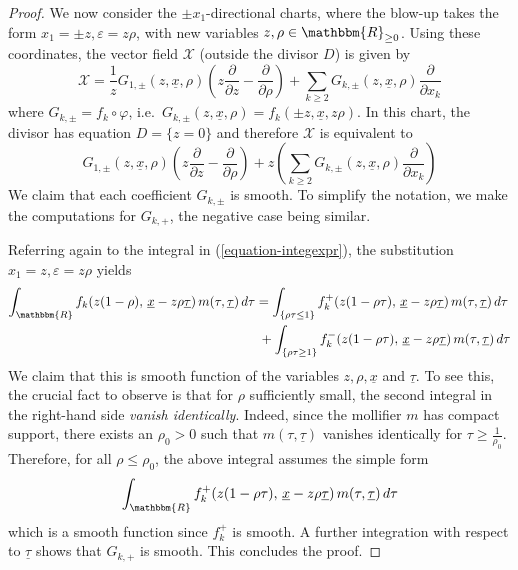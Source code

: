 \documentclass[10pt,a4paper]{amsart}
\newcommand{\cR}{\ensuremath{\mathbbm{R}}}
\newcommand{\eps}{\varepsilon }
\newcommand{\vf}{f}
\begin{document}
\begin{proof}
We now consider the $\pm x_1$-directional charts, where the blow-up takes the form $x_1 = \pm z, \eps= z \rho$, with new variables $z,\rho\in \cR_{\ge 0}$. Using these coordinates, the vector field $\mathcal{X}$ (outside the divisor $D$) is given by
\[
 \mathcal{X}= \frac{1}{z} G_{1,\pm} \left( z, \underline{x}, \rho
   \right) \left(z\frac{\partial}{\partial z}-\frac{\partial}{\partial \rho}\right) + \sum_{k \ge  2} G_{k,\pm} \left( z,
   \underline{x}, \rho \right) \frac{\partial}{\partial x_k} 
\]
where $G_{k,\pm}=f_k \circ \varphi$, i.e.\ $G_{k,\pm}( z,\underline{x}, \rho) = f_k(\pm z,\underline{x},z \rho)$.  
In this chart, the divisor has equation $D=\{ z = 0\}$ and therefore ${\mathcal{X}}$ is equivalent to 
$$
G_{1,\pm} \left( z, \underline{x}, \rho
   \right) \left(z\frac{\partial}{\partial z}-\frac{\partial}{\partial \rho}\right) + z \left( \sum_{k \ge  2} G_{k,\pm} \left( z,
   \underline{x}, \rho \right) \frac{\partial}{\partial x_k}  \right)
$$
We claim that each coefficient $G_{k,\pm}$ is smooth.  To simplify the notation, we make the computations for $G_{k,+}$, the negative case being similar.

Referring again to the integral in (\ref{equation-integexpr}), the substitution $x_1 = z, \eps= z \rho$ yields
\begin{align*}
\int_{\cR} 
   \vf_k\!\left( z(1-\rho), \, \underline{x} - z \rho \underline{\tau} \right) 
   m \!\left( \tau, \underline{\tau} \right) d\tau
   &= \int_{{\{ \rho \tau \le 1 \}}} 
        \vf_k^+ \!\left( z(1-\rho \tau), \, \underline{x} - z \rho \underline{\tau} \right) 
        m \!\left( \tau, \underline{\tau} \right) d\tau  \\
   &\; + \int_{{\{ \rho\tau  \ge 1 \}}} 
        \vf_k^- \!\left( z(1-\rho \tau), \, \underline{x} - z \rho \underline{\tau} \right) 
        m \!\left( \tau, \underline{\tau} \right) d\tau
\end{align*}
We claim that this is smooth function of the variables $z,\rho,\underline{x}$ and $\underline{\tau}$. To see this, the crucial fact to observe is that for $\rho$ sufficiently small, the second integral in the right-hand side {\em vanish identically}. Indeed, since the mollifier $m$ has compact support, there exists an $\rho_0 > 0$ such that $m(\tau,\underline{\tau})$ vanishes identically for $\tau \ge \frac{1}{\rho_0}$. Therefore, for all $\rho \le \rho_0$, the above integral assumes the simple form 
$$
\int_{{\cR}} 
        \vf_k^+ \!\left( z(1-\rho \tau), \, \underline{x} - z \rho \underline{\tau} \right) 
        m \!\left( \tau, \underline{\tau} \right) d\tau
$$
which is a smooth function since $\vf_k^+$ is smooth. 
A further integration with respect to $\underline{\tau}$ shows that $G_{k,+}$ is smooth. This concludes the proof. 
\end{proof}
\end{document}

